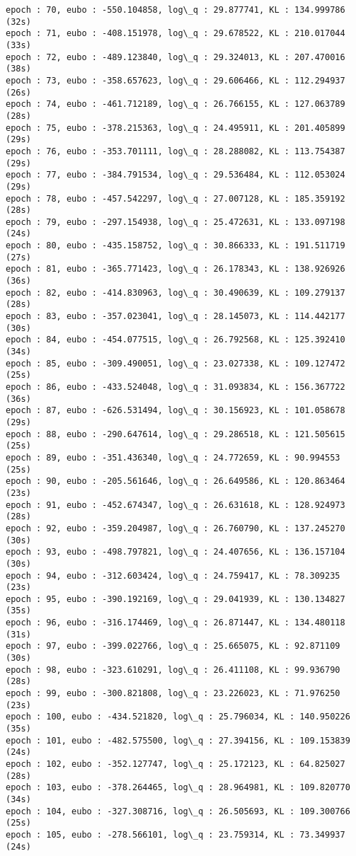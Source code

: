 \documentclass[11pt]{article}
\begin{document}
\begin{Verbatim}[commandchars=\\\{\}]
epoch : 70, eubo : -550.104858, log\_q : 29.877741, KL : 134.999786 (32s)
epoch : 71, eubo : -408.151978, log\_q : 29.678522, KL : 210.017044 (33s)
epoch : 72, eubo : -489.123840, log\_q : 29.324013, KL : 207.470016 (38s)
epoch : 73, eubo : -358.657623, log\_q : 29.606466, KL : 112.294937 (26s)
epoch : 74, eubo : -461.712189, log\_q : 26.766155, KL : 127.063789 (28s)
epoch : 75, eubo : -378.215363, log\_q : 24.495911, KL : 201.405899 (29s)
epoch : 76, eubo : -353.701111, log\_q : 28.288082, KL : 113.754387 (29s)
epoch : 77, eubo : -384.791534, log\_q : 29.536484, KL : 112.053024 (29s)
epoch : 78, eubo : -457.542297, log\_q : 27.007128, KL : 185.359192 (28s)
epoch : 79, eubo : -297.154938, log\_q : 25.472631, KL : 133.097198 (24s)
epoch : 80, eubo : -435.158752, log\_q : 30.866333, KL : 191.511719 (27s)
epoch : 81, eubo : -365.771423, log\_q : 26.178343, KL : 138.926926 (36s)
epoch : 82, eubo : -414.830963, log\_q : 30.490639, KL : 109.279137 (28s)
epoch : 83, eubo : -357.023041, log\_q : 28.145073, KL : 114.442177 (30s)
epoch : 84, eubo : -454.077515, log\_q : 26.792568, KL : 125.392410 (34s)
epoch : 85, eubo : -309.490051, log\_q : 23.027338, KL : 109.127472 (25s)
epoch : 86, eubo : -433.524048, log\_q : 31.093834, KL : 156.367722 (36s)
epoch : 87, eubo : -626.531494, log\_q : 30.156923, KL : 101.058678 (29s)
epoch : 88, eubo : -290.647614, log\_q : 29.286518, KL : 121.505615 (25s)
epoch : 89, eubo : -351.436340, log\_q : 24.772659, KL : 90.994553 (25s)
epoch : 90, eubo : -205.561646, log\_q : 26.649586, KL : 120.863464 (23s)
epoch : 91, eubo : -452.674347, log\_q : 26.631618, KL : 128.924973 (28s)
epoch : 92, eubo : -359.204987, log\_q : 26.760790, KL : 137.245270 (30s)
epoch : 93, eubo : -498.797821, log\_q : 24.407656, KL : 136.157104 (30s)
epoch : 94, eubo : -312.603424, log\_q : 24.759417, KL : 78.309235 (23s)
epoch : 95, eubo : -390.192169, log\_q : 29.041939, KL : 130.134827 (35s)
epoch : 96, eubo : -316.174469, log\_q : 26.871447, KL : 134.480118 (31s)
epoch : 97, eubo : -399.022766, log\_q : 25.665075, KL : 92.871109 (30s)
epoch : 98, eubo : -323.610291, log\_q : 26.411108, KL : 99.936790 (28s)
epoch : 99, eubo : -300.821808, log\_q : 23.226023, KL : 71.976250 (23s)
epoch : 100, eubo : -434.521820, log\_q : 25.796034, KL : 140.950226 (35s)
epoch : 101, eubo : -482.575500, log\_q : 27.394156, KL : 109.153839 (24s)
epoch : 102, eubo : -352.127747, log\_q : 25.172123, KL : 64.825027 (28s)
epoch : 103, eubo : -378.264465, log\_q : 28.964981, KL : 109.820770 (34s)
epoch : 104, eubo : -327.308716, log\_q : 26.505693, KL : 109.300766 (25s)
epoch : 105, eubo : -278.566101, log\_q : 23.759314, KL : 73.349937 (24s)

\end{Verbatim}
\end{document}
